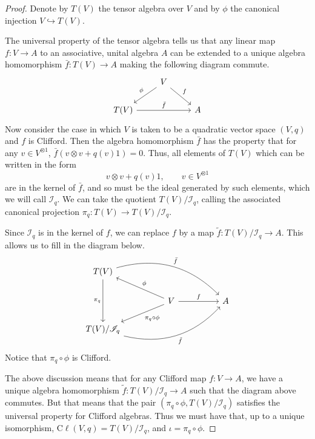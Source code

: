 \documentclass[a4paper]{report}
\newcommand{\cliff}{\mathrm{C}\ell}
\theoremstyle{definition}
\theoremstyle{plain}
\theoremstyle{remark}
\begin{document}
\begin{proof}
  Denote by $T(V)$ the tensor algebra over $V$ and by $\phi$ the canonical injection $V 
  \hookrightarrow T(V)$.

  The universal property of the tensor algebra tells us that any linear map $f\colon V \to A$ to an associative, unital algebra $A$ can be extended to a unique algebra homomorphism $\bar{f}\colon T(V) \to A$ making the following diagram commute.
  \begin{equation*}
    \begin{tikzcd}
      & V \arrow[dr, "f"] \arrow[dl, swap, "\phi"] & \\
      T(V) \arrow[rr, "\bar{f}"] & & A
    \end{tikzcd}
  \end{equation*}
  Now consider the case in which $V$ is taken to be a quadratic vector space $(V,q)$ and $f$ is Clifford. Then the algebra homomorphism $\bar{f}$ has the property that for any $v \in V^{\otimes 1}$, $\bar{f}(v \otimes v + q(v) 1) = 0$. Thus, all elements of $T(V)$ which can be written in the form
  \begin{equation*}
    v \otimes v + q(v)1,\qquad v \in V^{\otimes 1}
  \end{equation*}
  are in the kernel of $\bar{f}$, and so must be the ideal generated by such elements, which we will call $\mathscr{I}_{q}$. We can take the quotient $T(V)/\mathscr{I}_{q}$, calling the associated canonical projection $\pi_{q}\colon T(V) \to T(V)/\mathscr{I}_{q}$.

  Since $\mathscr{I}_{q}$ is in the kernel of $f$, we can replace $f$ by a map $\tilde{f}\colon T(V)/\mathscr{I}_{q} \to A$. This allows us to fill in the diagram below.
  \begin{equation*}
    \begin{tikzcd}[column sep=huge]
      T(V) \arrow[dd, swap, "\pi_{q}"] \arrow[drr, bend left, "\bar{f}"] & & \\
      & V \arrow[ul, swap, "\phi"] \arrow[dl, "\pi_{q} \circ \phi"] \arrow[r, "f"] & A \\
      {T(V)/\mathscr{I}_{q}} \arrow[urr, bend right, swap, "\tilde{f}"]
    \end{tikzcd}
  \end{equation*}
  Notice that $\pi_{q} \circ \phi$ is Clifford. 

  The above discussion means that for any Clifford map $f\colon V \to A$, we have a unique algebra homomorphism $\tilde{f}\colon T(V)/\mathscr{I}_{q} \to A$ such that the diagram above commutes. But that means that the pair $(\pi_{q} \circ \phi, T(V)/\mathscr{I}_{q})$ satisfies the universal property for Clifford algebras. Thus we must have that, up to a unique isomorphism, $\cliff(V,q) = T(V)/\mathscr{I}_{q}$, and $\iota = \pi_{q} \circ \phi$.
\end{proof}
\end{document}
